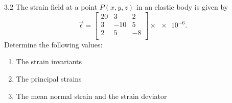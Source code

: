 
\begin{problem}{3.2}
  The strain field at a point $P(x,y,z)$ in an elastic body is given by
  \begin{equation*}
    \Vec{\epsilon} = \begin{bmatrix}
      20 & 3 & 2\\
    3 & -10 & 5\\
    2 & 5 & -8\\
    \end{bmatrix} \times \num{e-6} 
  .\end{equation*}
  Determine the following values:
  \begin{enumerate}
    \item[(a)] The strain invariants
    \item[(b)] The principal strains
    \item[(e)] The mean normal strain and the strain deviator
  \end{enumerate}
\end{problem}

